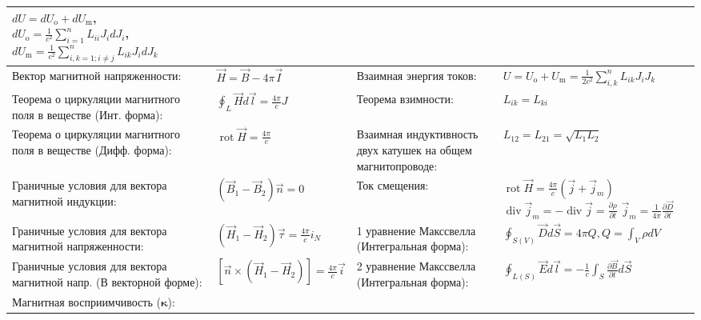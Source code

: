 \documentclass{article}
\begin{document}
\begin{tabular}{ |p{6cm}|p{3.5cm}|p{6cm}|p{3.5cm}|  }
$d U=d U_{\mathrm{o}}+d U_{\mathrm{m}}$,
$d U_{\mathrm{o}}=\frac{1}{c^{2}} \sum_{i=1}^{n} L_{i i} J_{i} d J_{i}$,
$d U_{\mathrm{m}}=\frac{1}{c^{2}} \sum_{i, k=1 ; i \neq j}^{n} L_{i k} J_{i} d J_{k}$\\
\hline
Вектор магнитной напряженности:                                            &
$\vec{H}=\vec{B} - 4 \pi \vec{I}$                                          &
Взаимная энергия токов:                                                    &
$U=U_{\mathrm{o}}+U_{\mathrm{m}}=\frac{1}{2 c^{2}} \sum_{i, k}^{n} L_{i k} J_{i} J_{k}$ \\
\hline
Теорема о циркуляции магнитного поля в веществе (Инт. форма):              &
$\oint_{L} \vec{H} d \vec{l}=\frac{4 \pi}{c} J$                            &
Теорема взимности:                                                         &
$L_{i k}=L_{k i}$                                                          \\
\hline
Теорема о циркуляции магнитного поля в веществе (Дифф. форма):             &
$\operatorname{rot} \vec{H}=\frac{4 \pi}{c}$                               &
Взаимная индуктивность двух катушек на общем магнитопроводе:               &
$L_{12}=L_{21}=\sqrt{L_{1} L_{2}}$                                         \\
\hline
Граничные условия для вектора магнитной индукции:                          &
$\left(\vec{B}_{1}-\vec{B}_{2}\right) \vec{n}=0$                           &
Ток смещения:                                                              &
$\operatorname{rot} \vec{H}=\frac{4 \pi}{c}\left(\vec{j}+\vec{j}_{m}\right)$
$\operatorname{div} \vec{j}_{m}=-\operatorname{div} \vec{j}=\frac{\partial \rho}{\partial t}$
$\vec{j}_{m}=\frac{1}{4 \pi} \frac{\partial \vec{D}}{\partial t}$          \\
\hline
Граничные условия для вектора магнитной напряженности:                     &
$\left(\vec{H}_{1}-\vec{H}_{2}\right) \vec{\tau}= \frac{4 \pi}{c} i_{N}$   &
1 уравнение Макссвелла (Интегральная форма):                               &
$\oint_{S(V)} \vec{D} d \vec{S}=4 \pi Q, Q=\int_{V} \rho d V$              \\
\hline
Граничные условия для вектора магнитной напр. (В векторной форме):         &
$[\vec{n} \times \left(\vec{H}_{1}-\vec{H}_{2}\right)]=\frac{4 \pi}{c} \vec{i}$ &
2 уравнение Макссвелла (Интегральная форма):                               &
$\oint_{L(S)} \vec{E} d \vec{l}=-\frac{1}{c} \int_{S} \frac{\partial \vec{B}}{\partial t} d \vec{S}$\\
\hline
Магнитная восприимчивость ($\boldsymbol{\kappa}$):                         &

\end{tabular}
\end{document}
